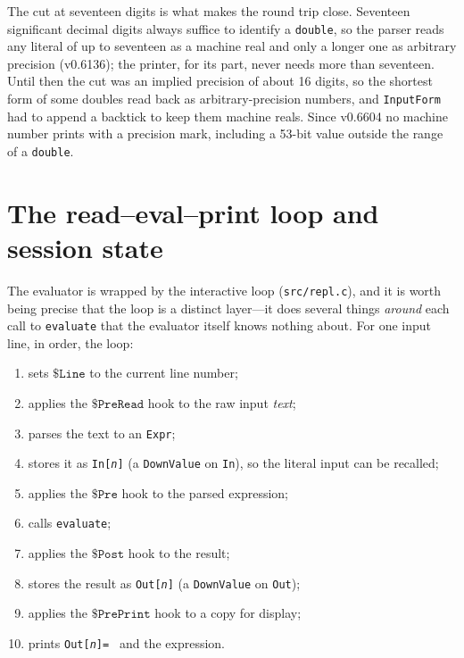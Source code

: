 The cut at seventeen digits is what makes the round trip close. Seventeen significant
decimal digits always suffice to identify a \texttt{double}, so the parser reads any
literal of up to seventeen as a machine real and only a longer one as arbitrary
precision (v0.6136); the printer, for its part, never needs more than seventeen. Until
then the cut was an implied precision of about 16 digits, so the shortest form of some
doubles read back as arbitrary-precision numbers, and \texttt{InputForm} had to append
a backtick to keep them machine reals. Since v0.6604 no machine number prints with a
precision mark, including a 53-bit value outside the range of a
\texttt{double}.

\section{The read--eval--print loop and session state}
\label{sec:int-repl}

The evaluator is wrapped by the interactive loop (\texttt{src/repl.c}), and it is
worth being precise that the loop is a distinct layer---it does several things
\emph{around} each call to \texttt{evaluate} that the evaluator itself knows nothing
about. For one input line, in order, the loop:

\begin{enumerate}
  \item sets \(\mathtt{\$Line}\) to the current line number;
  \item applies the \(\mathtt{\$PreRead}\) hook to the raw input \emph{text};
  \item parses the text to an \texttt{Expr};
  \item stores it as \texttt{In[\textit{n}]} (a \texttt{DownValue} on \texttt{In}), so
        the literal input can be recalled;
  \item applies the \(\mathtt{\$Pre}\) hook to the parsed expression;
  \item calls \texttt{evaluate};
  \item applies the \(\mathtt{\$Post}\) hook to the result;
  \item stores the result as \texttt{Out[\textit{n}]} (a \texttt{DownValue} on
        \texttt{Out});
  \item applies the \(\mathtt{\$PrePrint}\) hook to a copy for display;
  \item prints \texttt{Out[\textit{n}]= } and the expression.
\end{enumerate}

